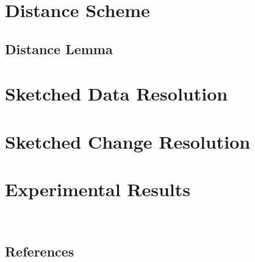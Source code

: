 \documentclass[10pt,a4paper]{article}
\begin{document}
\begin{multicols*}{2}
\section{Distance Scheme}

\subsection{Distance Lemma}

\section{Sketched Data Resolution}

\section{Sketched Change Resolution}

\section{Experimental Results}

\ 

\begin{center}
\section*{References}
\end{center}

\end{multicols*}
\end{document}
